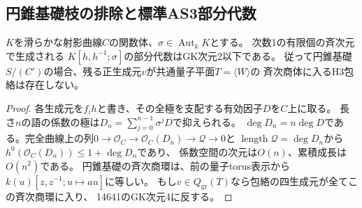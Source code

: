 \subsection{円錐基礎枝の排除と標準AS3部分代数}
\label{subsec:h3-positive3-cone-exclusion}
\begin{lemma}\label{lem:h3-curve-graded-division-growth}
$K$を滑らかな射影曲線$C$の関数体、$\sigma\in\operatorname{Aut}_kK$とする。
次数1の有限個の斉次元で生成される
$K[h,h^{-1};\sigma]$の部分代数はGK次元2以下である。
従って円錐基礎$S/(C')$の場合、残る正生成元$v$が共通量子平面$T=\langle W\rangle$の
斉次商体に入るH3包絡は存在しない。
\end{lemma}
\begin{proof}
各生成元を$f_i h$と書き、その全極を支配する有効因子$D$を$C$上に取る。
長さ$n$の語の係数の極は$D_n=\sum_{j=0}^{n-1}\sigma^jD$で抑えられる。
$\deg D_n=n\deg D$である。完全曲線上の列$0\to\mathcal O_C\to\mathcal O_C(D_n)\to\mathcal Q\to0$と
$\operatorname{length}\mathcal Q=\deg D_n$から$h^0(\mathcal O_C(D_n))\le1+\deg D_n$であり、
係数空間の次元は$O(n)$、累積成長は$O(n^2)$である。
円錐基礎の斉次商環は、前の量子torus表示から
$k(u)[z,z^{-1};u\mapsto au]$に等しい。
もし$v\in Q_{\mathrm{gr}}(T)$なら包絡の四生成元が全てこの斉次商環に入り、
14641のGK次元4に反する。
\end{proof}

